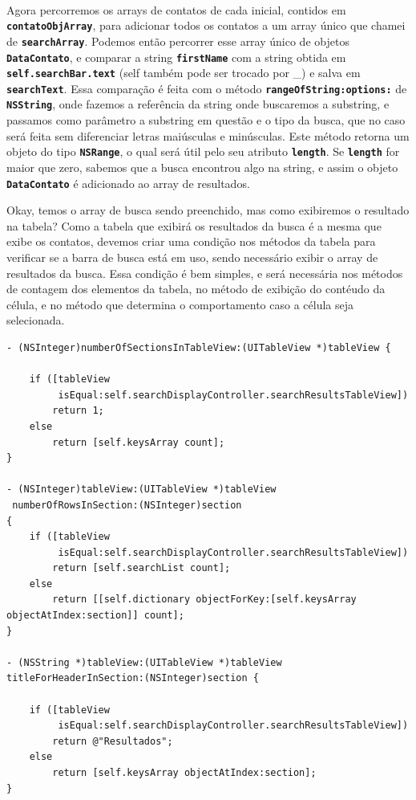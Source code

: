 \documentclass[a4paper,12pt,brazil,doubleside]{book}
\begin{document}
\paragraph{}Agora percorremos os arrays de contatos de cada inicial, contidos em \texttt{\textbf{contatoObjArray}}, para adicionar todos os contatos a um array único que chamei de \texttt{\textbf{searchArray}}. Podemos então percorrer esse array único de objetos \texttt{\textbf{DataContato}}, e comparar a string \texttt{\textbf{firstName}} com a string obtida em \texttt{\textbf{self.searchBar.text}} (self também pode ser trocado por \_) e salva em \texttt{\textbf{searchText}}. Essa comparação é feita com o método \texttt{\textbf{rangeOfString:options:}} de \texttt{\textbf{NSString}}, onde fazemos a referência da string onde buscaremos a substring, e passamos como parâmetro a substring em questão e o tipo da busca, que no caso será feita sem diferenciar letras maiúsculas e minúsculas. Este método retorna um objeto do tipo \texttt{\textbf{NSRange}}, o qual será útil pelo seu atributo \texttt{\textbf{length}}. Se \texttt{\textbf{length}} for maior que zero, sabemos que a busca encontrou algo na string, e assim o objeto \texttt{\textbf{DataContato}} é adicionado ao array de resultados.

\bigskip
\bigskip

Okay, temos o array de busca sendo preenchido, mas como exibiremos o resultado na tabela? Como a tabela que exibirá os resultados da busca é a mesma que exibe os contatos, devemos criar uma condição nos métodos da tabela para verificar se a barra de busca está em uso, sendo necessário exibir o array de resultados da busca. Essa condição é bem simples, e será necessária nos métodos de contagem dos elementos da tabela, no método de exibição do contéudo da célula, e no método que determina o comportamento caso a célula seja selecionada.

\begin{listing}
\begin{verbatim}
- (NSInteger)numberOfSectionsInTableView:(UITableView *)tableView {
    
    if ([tableView
         isEqual:self.searchDisplayController.searchResultsTableView])
        return 1;
    else
        return [self.keysArray count];
}

- (NSInteger)tableView:(UITableView *)tableView
 numberOfRowsInSection:(NSInteger)section
{
    if ([tableView
         isEqual:self.searchDisplayController.searchResultsTableView])
        return [self.searchList count];
    else
        return [[self.dictionary objectForKey:[self.keysArray objectAtIndex:section]] count];
}

- (NSString *)tableView:(UITableView *)tableView titleForHeaderInSection:(NSInteger)section {
    
    if ([tableView
         isEqual:self.searchDisplayController.searchResultsTableView])
        return @"Resultados";
    else
        return [self.keysArray objectAtIndex:section];
}
\end{verbatim}
\end{listing}
\end{document}
